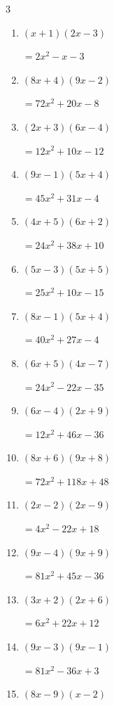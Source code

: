 \begin{multicols}{3}
\begin{enumerate}
        $=9x^{2}+37x-40$

\columnbreak %

  \item $(x+1)(2x-3)$

        $=2x^{2}-x-3$

  \item $(8x+4)(9x-2)$

        $=72x^{2}+20x-8$

  \item $(2x+3)(6x-4)$

        $=12x^{2}+10x-12$

  \item $(9x-1)(5x+4)$

        $=45x^{2}+31x-4$

  \item $(4x+5)(6x+2)$

        $=24x^{2}+38x+10$

  \item $(5x-3)(5x+5)$

        $=25x^{2}+10x-15$

  \item $(8x-1)(5x+4)$

        $=40x^{2}+27x-4$

  \item $(6x+5)(4x-7)$

        $=24x^{2}-22x-35$

  \item $(6x-4)(2x+9)$

        $=12x^{2}+46x-36$

  \item $(8x+6)(9x+8)$

        $=72x^{2}+118x+48$

  \item $(2x-2)(2x-9)$

        $=4x^{2}-22x+18$

  \item $(9x-4)(9x+9)$

        $=81x^{2}+45x-36$

  \item $(3x+2)(2x+6)$

        $=6x^{2}+22x+12$

  \item $(9x-3)(9x-1)$

        $=81x^{2}-36x+3$

  \item $(8x-9)(x-2)$


\end{enumerate}
\end{multicols}
